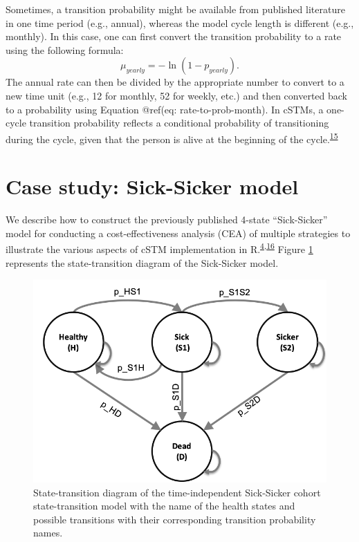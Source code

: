 \documentclass[
]{article}
\begin{document}
Sometimes, a transition probability might be available from published literature in one time period (e.g., annual), whereas the model cycle length is different (e.g., monthly). In this case, one can first convert the transition probability to a rate using the following formula:
\begin{equation}
    \mu_{yearly} = -\ln{\left(1-p_{yearly}\right)}.
    \label{eq:prob-to-rate-ann}
\end{equation}
The annual rate can then be divided by the appropriate number to convert to a new time unit (e.g., 12 for monthly, 52 for weekly, etc.) and then converted back to a probability using Equation @ref(eq: rate-to-prob-month). In cSTMs, a one-cycle transition probability reflects a conditional probability of transitioning during the cycle, given that the person is alive at the beginning of the cycle.\textsuperscript{\protect\hyperlink{ref-Miller1994}{15}}

\hypertarget{case-study-sick-sicker-model}{%
\section{Case study: Sick-Sicker model}\label{case-study-sick-sicker-model}}

We describe how to construct the previously published 4-state ``Sick-Sicker'' model for conducting a cost-effectiveness analysis (CEA) of multiple strategies to illustrate the various aspects of cSTM implementation in R.\textsuperscript{\protect\hyperlink{ref-Krijkamp2018}{4},\protect\hyperlink{ref-Enns2015e}{16}} Figure \ref{fig:STD-Sick-Sicker} represents the state-transition diagram of the Sick-Sicker model.

\begin{figure}[H]

{\centering \includegraphics[width=10.64in]{figs/Sick-Sicker} 

}

\caption{State-transition diagram of the time-independent Sick-Sicker cohort state-transition model with the name of the health states and possible transitions with their corresponding transition probability names.}\label{fig:STD-Sick-Sicker}
\end{figure}
\end{document}
